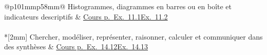 \begin{longtable}{@{}p{101mm}p{58mm}@{}}
Histogrammes, diagrammes en barres ou en boîte et indicateurs descriptifs & \hyperref[ess-11]{Cours p.~\pageref*{ess-11}}\newline \hyperref[exo-11-1]{Ex.~11.1}\newline \hyperref[exo-11-2]{Ex.~11.2}\\[2.3mm]
\\*[2mm]
Chercher, modéliser, représenter, raisonner, calculer et communiquer dans des synthèses & \hyperref[ess-14]{Cours p.~\pageref*{ess-14}}\newline \hyperref[exo-14-12]{Ex.~14.12}\newline \hyperref[exo-14-13]{Ex.~14.13}\\[2.3mm]
\bottomrule\end{longtable}\endgroup\clearpage
